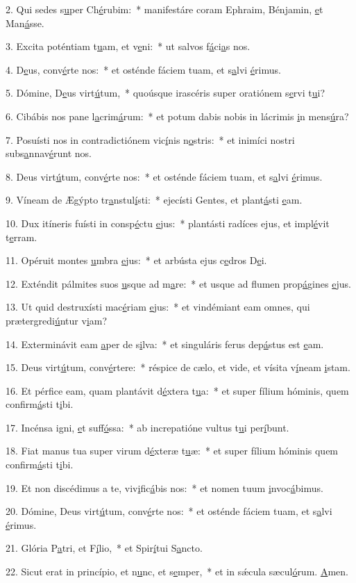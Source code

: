 2. Qui sedes s\uline{u}per Ch\uline{é}rubim:~* manifestáre coram Ephraim, Bénjamin, \uline{e}t Man\uline{á}sse.\par 
3. Excita poténtiam t\uline{u}am, et v\uline{e}ni:~* ut salvos f\uline{á}ci\uline{a}s nos.\par 
4. D\uline{e}us, conv\uline{é}rte nos:~* et osténde fáciem tuam, et s\uline{a}lvi \uline{é}rimus.\par 
5. Dómine, D\uline{e}us virt\uline{ú}tum,~* quoúsque irascéris super oratiónem s\uline{e}rvi t\uline{u}i?\par 
6. Cibábis nos pane l\uline{a}crim\uline{á}rum:~* et potum dabis nobis in lácrimis \uline{i}n mens\uline{ú}ra?\par 
7. Posuísti nos in contradictiónem vic\uline{í}nis n\uline{o}stris:~* et inimíci nostri subs\uline{a}nnav\uline{é}runt nos.\par 
8. Deus virt\uline{ú}tum, conv\uline{é}rte nos:~* et osténde fáciem tuam, et s\uline{a}lvi \uline{é}rimus.\par 
9. Víneam de Ægýpto tr\uline{a}nstul\uline{í}sti:~* ejecísti Gentes, et plant\uline{á}sti \uline{e}am.\par 
10. Dux itíneris fuísti in consp\uline{é}ctu \uline{e}jus:~* plantásti radíces ejus, et impl\uline{é}vit t\uline{e}rram.\par 
11. Opéruit montes \uline{u}mbra \uline{e}jus:~* et arbústa ejus c\uline{e}dros D\uline{e}i.\par 
12. Exténdit pálmites suos \uline{u}sque ad m\uline{a}re:~* et usque ad flumen prop\uline{á}gines \uline{e}jus.\par 
13. Ut quid destruxísti mac\uline{é}riam \uline{e}jus:~* et vindémiant eam omnes, qui prætergredi\uline{ú}ntur v\uline{i}am?\par 
14. Exterminávit eam \uline{a}per de s\uline{i}lva:~* et singuláris ferus dep\uline{á}stus est \uline{e}am.\par 
15. Deus virt\uline{ú}tum, conv\uline{é}rtere:~* réspice de cælo, et vide, et vísita v\uline{í}neam \uline{i}stam.\par 
16. Et pérfice eam, quam plantávit d\uline{é}xtera t\uline{u}a:~* et super fílium hóminis, quem confirm\uline{á}sti t\uline{i}bi.\par 
17. Incénsa igni, \uline{e}t suff\uline{ó}ssa:~* ab increpatióne vultus t\uline{u}i per\uline{í}bunt.\par 
18. Fiat manus tua super virum d\uline{é}xteræ t\uline{u}æ:~* et super fílium hóminis quem confirm\uline{á}sti t\uline{i}bi.\par 
19. Et non discédimus a te, viv\uline{i}fic\uline{á}bis nos:~* et nomen tuum \uline{i}nvoc\uline{á}bimus.\par 
20. Dómine, Deus virt\uline{ú}tum, conv\uline{é}rte nos:~* et osténde fáciem tuam, et s\uline{a}lvi \uline{é}rimus.\par 
21. Glória P\uline{a}tri, et F\uline{í}lio,~* et Spir\uline{í}tui S\uline{a}ncto.\par 
22. Sicut erat in princípio, et n\uline{u}nc, et s\uline{e}mper,~* et in sǽcula sæcul\uline{ó}rum. \uline{A}men.\par 
